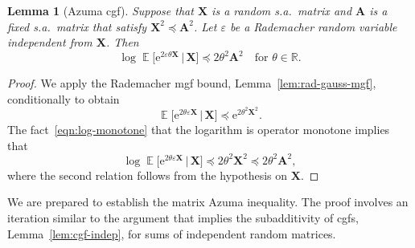 \documentclass[11pt,letterpaper,twoside,reqno,draft]{amsart}
\newtheorem{lemma}[thm]{Lemma}
\theoremstyle{remark}
\numberwithin{equation}{section}
\numberwithin{thm}{section}
\begin{document}
\begin{lemma}[Azuma cgf] \label{lem:azuma-cgf}
Suppose that ${\bm{{X}}}$ is a random s.a.~matrix and ${\bm{{A}}}$ is a fixed s.a.~matrix that satisfy ${\bm{{X}}}^2 {\preccurlyeq} {\bm{{A}}}^2$.  Let ${\varepsilon}$ be a Rademacher random variable independent from ${\bm{{X}}}$.  Then
$$
\log {\operatorname{\mathbb{E}}}\big[ {\mathrm{e}}^{2{\varepsilon} \theta {\bm{{X}}}} \, | \, {\bm{{X}}} \big]
	{\preccurlyeq} 2\theta^2 {\bm{{A}}}^2
	\quad\text{for $\theta \in \mathbb{R}$.}
$$
\end{lemma}

\begin{proof}
We apply the Rademacher mgf bound, Lemma~\ref{lem:rad-gauss-mgf}, conditionally to obtain
$$
{\operatorname{\mathbb{E}}}\big[ {\mathrm{e}}^{2\theta {\varepsilon} {\bm{{X}}}} \, | \, {\bm{{X}}} \big]
	{\preccurlyeq} {\mathrm{e}}^{2\theta^2 {\bm{{X}}}^2}.
$$
The fact~\eqref{eqn:log-monotone} that the logarithm is operator monotone implies that
$$
\log {\operatorname{\mathbb{E}}}\big[ {\mathrm{e}}^{2\theta {\varepsilon} {\bm{{X}}}} \, | \, {\bm{{X}}} \big]
	{\preccurlyeq} 2\theta^2 {\bm{{X}}}^2
	{\preccurlyeq} 2\theta^2 {\bm{{A}}}^2,
$$
where the second relation follows from the hypothesis on ${\bm{{X}}}$.
\end{proof}

We are prepared to establish the matrix Azuma inequality.  The proof involves an iteration similar to the argument that implies the subadditivity of cgfs, Lemma~\ref{lem:cgf-indep}, for sums of independent random matrices.
\end{document}
